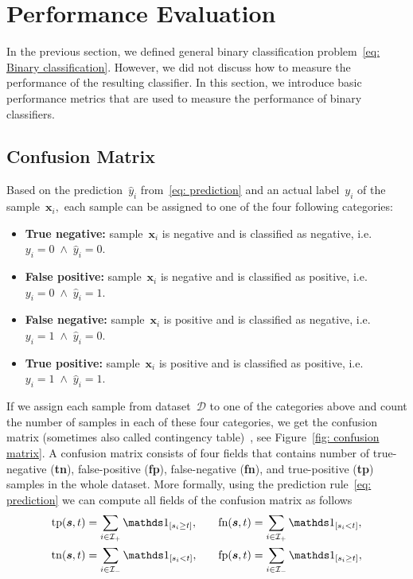 \section{Performance Evaluation}

In the previous section, we defined general binary classification problem~\eqref{eq: Binary classification}. However, we did not discuss how to measure the performance of the resulting classifier. In this section, we introduce basic performance metrics  that are used to measure the performance of binary classifiers.

\subsection{Confusion Matrix}

Based on the prediction~$\hat{y}_i$ from~\eqref{eq: prediction} and an actual label~$y_i$ of the sample~$\bm{x}_i,$ each sample can be assigned to one of the four following categories:
\begin{itemize}
  \item \textbf{True negative:} sample~$\bm{x}_i$ is negative and is classified as negative, i.e.~$y_i = 0 \; \land \; \hat{y}_i = 0.$
  \item \textbf{False positive:} sample~$\bm{x}_i$ is negative and is classified as positive, i.e.~$y_i = 0 \; \land \; \hat{y}_i = 1.$
  \item \textbf{False negative:} sample~$\bm{x}_i$ is positive and is classified as negative, i.e.~$y_i = 1 \; \land \; \hat{y}_i = 0.$
  \item \textbf{True positive:} sample~$\bm{x}_i$ is positive and is classified as positive, i.e.~$y_i = 1 \; \land \; \hat{y}_i = 1.$
\end{itemize}
If we assign each sample from dataset~$\mathcal{D}$ to one of the categories above and count the number of samples in each of these four categories, we get the confusion matrix (sometimes also called contingency table)~\cite{fawcett2006introduction}, see Figure~\ref{fig: confusion matrix}. A confusion matrix consists of four fields that contains number of true-negative (\textbf{tn}), false-positive (\textbf{fp}), false-negative (\textbf{fn}), and true-positive (\textbf{tp}) samples in the whole dataset. More formally, using the prediction rule~\eqref{eq: prediction} we can compute all fields of the confusion matrix as follows
\begin{equation}\label{eq: confusion counts}
  \begin{aligned}
    \tp(\bm{s}, t) & = \sum_{i \in \Ipos}\Iverson{s_i \geq t}, & \quad
    \fn(\bm{s}, t) & = \sum_{i \in \Ipos}\Iverson{s_i < t}, \\
    \tn(\bm{s}, t) & = \sum_{i \in \Ineg}\Iverson{s_i < t}, & \quad
    \fp(\bm{s}, t) & = \sum_{i \in \Ineg}\Iverson{s_i \geq t},
  \end{aligned}
\end{equation}

